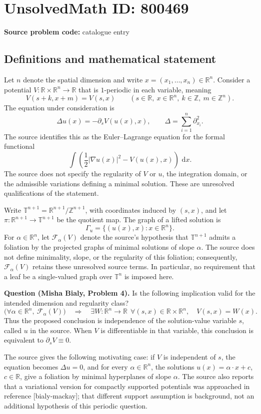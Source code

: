 \documentclass[11pt]{article}
\newcommand{\Z}{\mathbb{Z}}
\newcommand{\R}{\mathbb{R}}
\newcommand{\dd}{\,\mathrm{d}}
\begin{document}
\section*{UnsolvedMath ID: 800469}
\textbf{Source problem code:} catalogue entry
\subsection{Definitions and mathematical statement}
Let \(n\) denote the spatial dimension and write \(x=(x_1,\ldots,x_n)\in\R^n\). Consider a potential \(V:\R\times\R^n\to\R\) that is \(1\)-periodic in each variable, meaning
\[
V(s+k,x+m)=V(s,x)\qquad(s\in\R,\ x\in\R^n,\ k\in\Z,\ m\in\Z^n).
\]
The equation under consideration is
\[
\Delta u(x)=-\partial_sV(u(x),x),\qquad
\Delta=\sum_{i=1}^{n}\partial_{x_i}^2.
\]
The source identifies this as the Euler--Lagrange equation for the formal functional
\[
\int\left(\frac12|\nabla u(x)|^2-V(u(x),x)\right)\,\dd x.
\]
The source does not specify the regularity of \(V\) or \(u\), the integration domain, or the admissible variations defining a minimal solution. These are unresolved qualifications of the statement.

Write \(\mathbb T^{n+1}=\R^{n+1}/\Z^{n+1}\), with coordinates induced by \((s,x)\), and let \(\pi:\R^{n+1}\to\mathbb T^{n+1}\) be the quotient map. The graph of a lifted solution is
\[
\Gamma_u=\{(u(x),x):x\in\R^n\}.
\]
For \(\alpha\in\R^n\), let \(\mathcal F_\alpha(V)\) denote the source's hypothesis that \(\mathbb T^{n+1}\) admits a foliation by the projected graphs of minimal solutions of slope \(\alpha\). The source does not define minimality, slope, or the regularity of this foliation; consequently, \(\mathcal F_\alpha(V)\) retains these unresolved source terms. In particular, no requirement that a leaf be a single-valued graph over \(\mathbb T^n\) is imposed here.

\textbf{Question (Misha Bialy, Problem 4).} Is the following implication valid for the intended dimension and regularity class?
\[
\bigl(\forall\alpha\in\R^n,\ \mathcal F_\alpha(V)\bigr)
\quad\Longrightarrow\quad
\exists W:\R^n\to\R\ \ \forall(s,x)\in\R\times\R^n,
\quad V(s,x)=W(x).
\]
Thus the proposed conclusion is independence of the solution-value variable \(s\), called \(u\) in the source. When \(V\) is differentiable in that variable, this conclusion is equivalent to \(\partial_sV\equiv0\).

The source gives the following motivating case: if \(V\) is independent of \(s\), the equation becomes \(\Delta u=0\), and for every \(\alpha\in\R^n\), the solutions \(u(x)=\alpha\cdot x+c\), \(c\in\R\), give a foliation by minimal hyperplanes of slope \(\alpha\). The source also reports that a variational version for compactly supported potentials was approached in reference [bialy-mackay]; that different support assumption is background, not an additional hypothesis of this periodic question.
\end{document}
